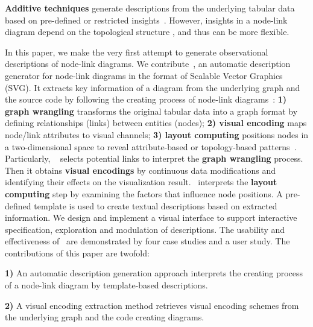 \textbf{Additive techniques} generate descriptions from the underlying tabular data based on pre-defined or restricted insights~\cite{DBLP:journals/pvldb/DemiralpHPP17, DBLP:journals/tvcg/WangSZCXMZ20, DBLP:conf/apvis/LiuXHWY20, DBLP:conf/chi/KimHA20}. However, insights in a node-link diagram depend on the topological structure 
, and thus
can be more flexible.


In this paper, we make the very first attempt to generate observational descriptions of node-link diagrams.
We contribute~\textit{\ApproachName}, an automatic description generator for node-link diagrams in the format of Scalable Vector Graphics (SVG). 
It extracts key information of a diagram from the underlying graph and the source code by following the creating process of node-link diagrams~\cite{DBLP:journals/cgf/SpritzerBDFF15, tvcg/RomatAP21}:
\textbf{1) graph wrangling} transforms the original tabular data into a graph format by defining relationships (links) between entities (nodes);
\textbf{2) visual encoding} maps node/link attributes to visual channels;
\textbf{3) layout computing} positions nodes in a two-dimensional space to reveal attribute-based or topology-based patterns~\cite{DBLP:journals/cgf/NobreMSL19}.
Particularly, \ApproachName~
selects potential links to interpret the \textbf{graph wrangling} process.
Then it obtains \textbf{visual encodings} by continuous data modifications and identifying their effects on the visualization result.
\ApproachName~interprets the \textbf{layout computing} step by examining the factors that influence node positions.
A pre-defined template is used to create textual descriptions based on extracted information. 
We design and implement a visual interface to support interactive specification, exploration and modulation of descriptions.
The usability and effectiveness of \ApproachName~are demonstrated by four case studies and a user study.
The contributions of this paper are twofold:

\noindent \textbf{1)} An automatic description generation approach interprets the creating process of a node-link diagram by template-based descriptions.

\noindent \textbf{2)} A visual encoding extraction method retrieves visual encoding schemes from the underlying graph and the code creating diagrams.
\fi
